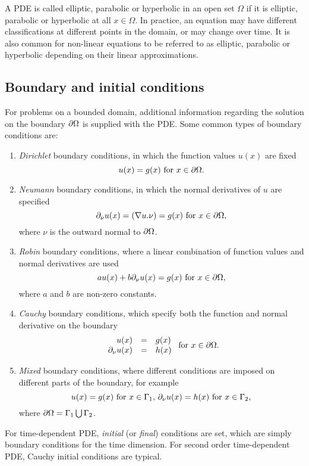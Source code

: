 A PDE is called elliptic, parabolic or hyperbolic in an open set $\Omega$ if it is elliptic, parabolic or hyperbolic at all $x\in \Omega$. In practice, an equation may have different classifications at different points in the domain, or may change over time. It is also common for non-linear equations to be referred to as elliptic, parabolic or hyperbolic depending on their linear approximations.

\subsection{Boundary and initial conditions}
For problems on a bounded domain, additional information regarding the solution on the boundary ${\partial} \Omega$ is supplied with the PDE. Some common types of boundary conditions are:
\begin{enumerate}
	\item \textit{Dirichlet} boundary conditions, in which the function values $u(x)$ are fixed %
	\[ u(x) = g(x) \mbox{  for } x\in {\partial} \Omega. \]
	\item \textit{Neumann} boundary conditions, in which the normal derivatives of $u$ are specified
	\[ {\partial}_{\nu} u (x)= (\nabla u. \nu)= g(x) \mbox{  for } x\in {\partial} \Omega, \]
	where $\nu$ is the outward normal to ${\partial} \Omega$.
	\item \textit{Robin} boundary conditions, where a linear combination of function values and normal derivatives are used 
	\[ au(x) + b {\partial}_{\nu}u (x)= g(x) \mbox{  for } x\in {\partial} \Omega,\]
	where $a$ and $b$ are non-zero constants.
	\item \textit{Cauchy} boundary conditions, which specify both the function and normal derivative on the boundary
	\[ \begin{array}{rcl}
	u(x) &=& g(x) \\
	{\partial}_{\nu}u (x) &=& h(x) 
	\end{array} \mbox{  for } x\in {\partial} \Omega. \]
	\item \textit{Mixed} boundary conditions, where different conditions are imposed on different parts of the boundary, for example
	\[ u(x)=g(x) \mbox{  for } x\in \Gamma_1 \mbox{, } {\partial}_{\nu}u (x) = h(x) \mbox{  for } x\in \Gamma_2, \]
	where ${\partial} \Omega = \Gamma_1 \bigcup \Gamma_2$.
\end{enumerate}

For time-dependent PDE, \textit{initial} (or \textit{final}) conditions are set, which are simply boundary conditions for the time dimension. For second order time-dependent PDE, Cauchy initial conditions are typical.

